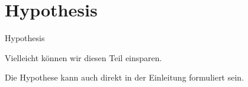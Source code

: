 \chapter{Hypothesis}
\label{cha:Hypothesis}
Hypothesis

Vielleicht können wir diesen Teil einsparen.

Die Hypothese kann auch direkt in der Einleitung formuliert sein.



